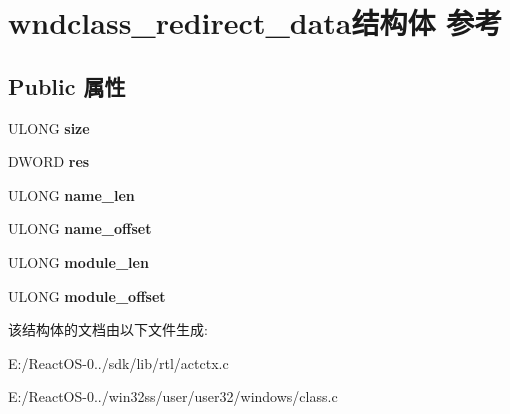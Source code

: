 \hypertarget{structwndclass__redirect__data}{}\section{wndclass\+\_\+redirect\+\_\+data结构体 参考}
\label{structwndclass__redirect__data}
\subsection*{Public 属性}
\begin{DoxyCompactItemize}
\item 
\mbox{\label{structwndclass__redirect__data_aa5dc5fa8f3ab580356b2da4e7b42659c}} 
U\+L\+O\+NG {\bfseries size}
\item 
\mbox{\label{structwndclass__redirect__data_a383cf907c64279463440191269c46ac1}} 
D\+W\+O\+RD {\bfseries res}
\item 
\mbox{\label{structwndclass__redirect__data_aa454ab204f98ab612e807304c3ba5de0}} 
U\+L\+O\+NG {\bfseries name\+\_\+len}
\item 
\mbox{\label{structwndclass__redirect__data_ab335b1b32a41ad7568d33e677c9ce452}} 
U\+L\+O\+NG {\bfseries name\+\_\+offset}
\item 
\mbox{\label{structwndclass__redirect__data_a5b0e77b1c18831bcb39fcaa649b6445c}} 
U\+L\+O\+NG {\bfseries module\+\_\+len}
\item 
\mbox{\label{structwndclass__redirect__data_a5d6507dcb5779f99a72e3fbd4e0e33bc}} 
U\+L\+O\+NG {\bfseries module\+\_\+offset}
\end{DoxyCompactItemize}


该结构体的文档由以下文件生成\+:\begin{DoxyCompactItemize}
\item 
E\+:/\+React\+O\+S-\/0../sdk/lib/rtl/actctx.\+c\item 
E\+:/\+React\+O\+S-\/0../win32ss/user/user32/windows/class.\+c\end{DoxyCompactItemize}
